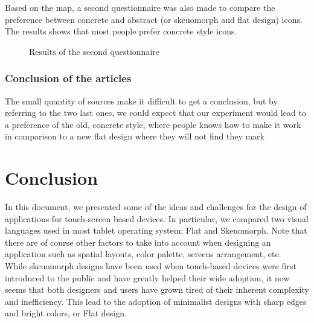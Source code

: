 \documentclass[a4paper,11pt] {article}
\theoremstyle{definition}
\begin{document}
    Based on the map, a second questionnaire was also made to compare the preference between concrete and abstract (or skeuomorph and flat design) icons. The results shows that most people prefer concrete style icons.

    \begin{figure}[H]
      \caption{Results of the second questionnaire}\label{jppage10}
    \end{figure}

    \subsubsection{Conclusion of the articles}
        The small quantity of sources make it difficult to get a conclusion, but by referring to the two last ones, we could expect that our experiment would lead to a preference of the old, concrete style, where people knows how to make it work in comparison to a new flat design where they will not find they mark

\section{Conclusion}

In this document, we presented some of the ideas and challenges for the design of applications for touch-screen based devices. In particular, we compared two visual languages used in most tablet operating system: Flat and Skeuomorph. Note that there are of course other factors to take into account when designing an application such as spatial layouts, color palette, screens arrangement, etc.\\

While skeuomorph designs have been used when touch-based devices were first introduced to the public and have greatly helped their wide adoption, it now seems that both designers and users have grown tired of their inherent complexity and inefficiency. This lead to the adoption of minimalist designs with sharp edges and bright colors, or Flat design.\\
\end{document}
